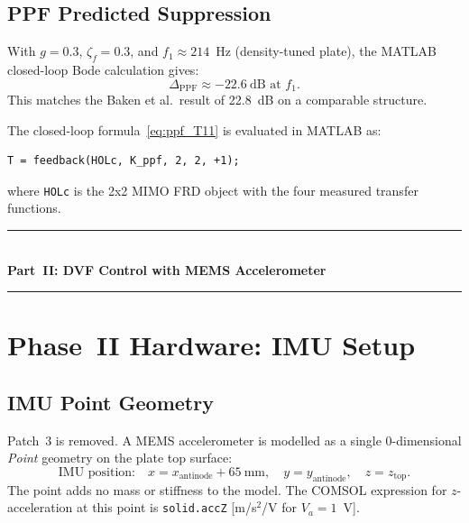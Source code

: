 \documentclass[12pt,a4paper]{article}
\begin{document}
\subsection{PPF Predicted Suppression}
\label{sec:ppf_results}

With $g = 0.3$, $\zeta_f = 0.3$, and $f_1 \approx 214$~Hz (density-tuned plate),
the MATLAB closed-loop Bode calculation gives:
\begin{equation}
  \Delta_\text{PPF} \approx -22.6\ \text{dB at } f_1.
\end{equation}
This matches the Baken et al.\ result of 22.8~dB on a comparable structure.

The closed-loop formula~\eqref{eq:ppf_T11} is evaluated in MATLAB as:
\begin{verbatim}
T = feedback(HOLc, K_ppf, 2, 2, +1);
\end{verbatim}
where \texttt{HOLc} is the 2x2 MIMO FRD object with the four measured transfer
functions.

\newpage
\begin{center}
  \rule{\linewidth}{1.5pt}\\[6pt]
  {\LARGE\bfseries Part~II: DVF Control with MEMS Accelerometer}\\[6pt]
  \rule{\linewidth}{1.5pt}
\end{center}

\section{Phase~II Hardware: IMU Setup}
\label{sec:imu_setup}

\subsection{IMU Point Geometry}

Patch~3 is removed.  A MEMS accelerometer is modelled as a single 0-dimensional
\emph{Point} geometry on the plate top surface:
\begin{equation}
  \text{IMU position:}\quad
  x = x_{\text{antinode}} + 65\ \text{mm},\quad
  y = y_{\text{antinode}},\quad
  z = z_\text{top}.
\end{equation}
The point adds no mass or stiffness to the model.  The COMSOL expression for
$z$-acceleration at this point is \texttt{solid.accZ} [m/s$^2$/V for $V_a = 1$~V].
\end{document}
